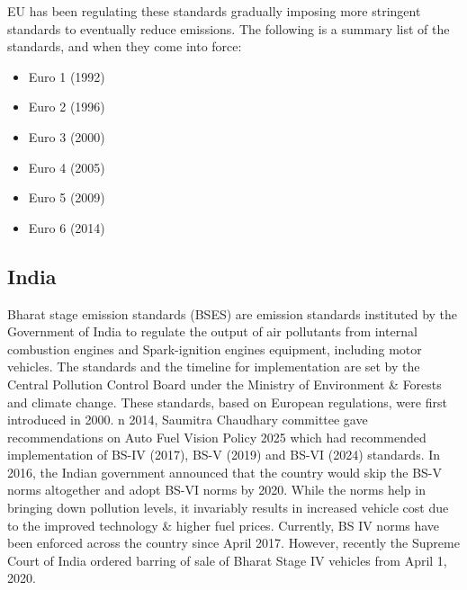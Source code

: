 EU has been regulating these standards gradually imposing more stringent standards to eventually reduce emissions. The following is a summary list of the standards, and when they come into force:
\begin{itemize}
	\item Euro 1 (1992)
	\item Euro 2 (1996)
	\item Euro 3 (2000)
	\item Euro 4 (2005)
	\item Euro 5 (2009)
	\item Euro 6 (2014)
\end{itemize}
\subsection{India}
Bharat stage emission standards (BSES) are emission standards instituted by the Government of India to regulate the output of air pollutants from internal combustion engines and Spark-ignition engines equipment, including motor vehicles. The standards and the timeline for implementation are set by the Central Pollution Control Board under the Ministry of Environment \& Forests and climate change. These standards, based on European regulations, were first introduced in 2000. n 2014, Saumitra Chaudhary committee gave recommendations on Auto Fuel Vision Policy 2025 which had recommended implementation of BS-IV (2017), BS-V (2019) and BS-VI (2024) standards. In 2016, the Indian government announced that the country would skip the BS-V norms altogether and adopt BS-VI norms by 2020. While the norms help in bringing down pollution levels, it invariably results in increased vehicle cost due to the improved technology \& higher fuel prices. Currently, BS IV norms have been enforced across the country since April 2017. However, recently the Supreme Court of India ordered barring of sale of Bharat Stage IV vehicles from April 1, 2020.
